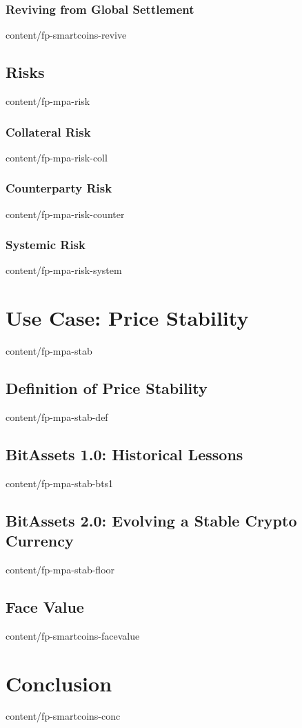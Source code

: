 \documentclass{btswhitepaper}
\begin{document}
\subsubsection { Reviving from Global Settlement                  }  { content/fp-smartcoins-revive      }

\subsection    { Risks                                            }  { content/fp-mpa-risk               }
\subsubsection { Collateral Risk                                  }  { content/fp-mpa-risk-coll          }
\subsubsection { Counterparty Risk                                }  { content/fp-mpa-risk-counter       }
\subsubsection { Systemic Risk                                    }  { content/fp-mpa-risk-system        }

\section       { Use Case: Price Stability                        }  { content/fp-mpa-stab               }
\subsection    { Definition of Price Stability                    }  { content/fp-mpa-stab-def           }
\subsection    { BitAssets 1.0: Historical Lessons                }  { content/fp-mpa-stab-bts1          }
\subsection    { BitAssets 2.0: Evolving a Stable Crypto Currency }  { content/fp-mpa-stab-floor         }
\subsection    { Face Value                                       }  { content/fp-smartcoins-facevalue   }


\section       { Conclusion                                       }  { content/fp-smartcoins-conc        }


\end{document}
